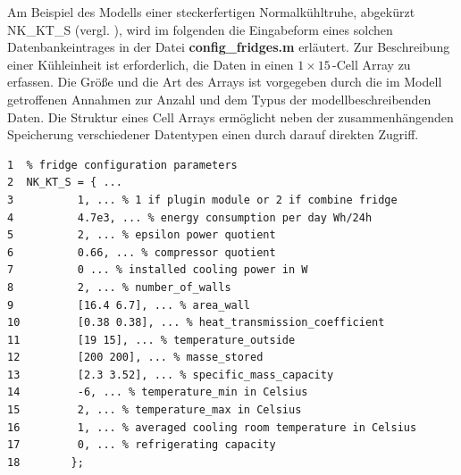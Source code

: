 Am Beispiel des Modells einer steckerfertigen
Normalkühltruhe, abgekürzt NK\_KT\_S (vergl.
), wird im folgenden die Eingabeform eines solchen
Datenbankeintrages in der Datei \textbf{config\_fridges.m} erläutert. Zur
Beschreibung einer Kühleinheit ist erforderlich, die Daten in einen
$1\times15\,$-Cell Array zu erfassen.  Die Größe und die Art des Arrays ist
vorgegeben durch die im Modell getroffenen Annahmen zur
Anzahl und dem Typus der modellbeschreibenden Daten. Die Struktur eines Cell
Arrays ermöglicht neben der zusammenhängenden Speicherung verschiedener
Datentypen einen durch \matlab darauf direkten Zugriff.

\begin{lstlisting}[caption=config\_fridges.m,label={fridge}]
1  % fridge configuration parameters
2  NK_KT_S = { ...
3          1, ... % 1 if plugin module or 2 if combine fridge
4          4.7e3, ... % energy consumption per day Wh/24h
5          2, ... % epsilon power quotient
6          0.66, ... % compressor quotient
7          0 ... % installed cooling power in W
8          2, ... % number_of_walls
9          [16.4 6.7], ... % area_wall
10         [0.38 0.38], ... % heat_transmission_coefficient
11         [19 15], ... % temperature_outside
12         [200 200], ... % masse_stored
13         [2.3 3.52], ... % specific_mass_capacity
14         -6, ... % temperature_min in Celsius
15         2, ... % temperature_max in Celsius
16         1, ... % averaged cooling room temperature in Celsius
17         0, ... % refrigerating capacity
18        };
\end{lstlisting}

